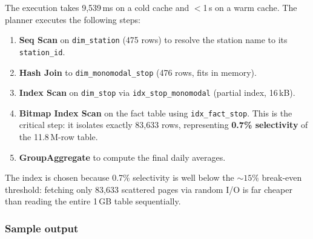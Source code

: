 \documentclass[a4paper,11pt]{article}
\begin{document}
The execution takes 9,539\,ms on a cold cache and $<$1\,s on a warm cache.
The planner executes the following steps:
\begin{enumerate}
  \item \textbf{Seq Scan} on \texttt{dim\_station} (475 rows) to resolve the
    station name to its \texttt{station\_id}.
  \item \textbf{Hash Join} to \texttt{dim\_monomodal\_stop} (476 rows, fits in memory).
  \item \textbf{Index Scan} on \texttt{dim\_stop} via \texttt{idx\_stop\_monomodal}
    (partial index, 16\,kB).
  \item \textbf{Bitmap Index Scan} on the fact table using \texttt{idx\_fact\_stop}.
    This is the critical step: it isolates exactly 83,633 rows, representing
    \textbf{0.7\% selectivity} of the 11.8\,M-row table.
  \item \textbf{GroupAggregate} to compute the final daily averages.
\end{enumerate}
The index is chosen because 0.7\% selectivity is well below the ${\sim}15\%$
break-even threshold: fetching only 83,633 scattered pages via random I/O is
far cheaper than reading the entire 1\,GB table sequentially.

\subsubsection{Sample output}

\begin{table}[H]
\centering
\small
{}%
\caption{Q5 sample output for Ch\^{a}telet les Halles (first 5 days of corpus).}
\end{table}
\end{document}
